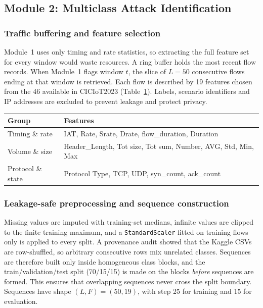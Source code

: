 \documentclass[]{interact}
\theoremstyle{plain}
\theoremstyle{definition}
\begin{document}
\subsection{Module 2: Multiclass Attack Identification}

\subsubsection{Traffic buffering and feature selection}
Module~1 uses only timing and rate statistics, so extracting the full feature set for every window would waste resources. A ring buffer holds the most recent flow records. When Module~1 flags window $t$, the slice of $L=50$ consecutive flows ending at that window is retrieved. Each flow is described by 19 features chosen from the 46 available in CICIoT2023 (Table~\ref{tab:feat}). Labels, scenario identifiers and IP addresses are excluded to prevent leakage and protect privacy.

\begin{table}[t]
{\begin{tabular}{lp{}}
\toprule
Group & Features \\
\midrule
Timing \& rate     & IAT, Rate, Srate, Drate, flow\_duration, Duration \\
Volume \& size     & Header\_Length, Tot size, Tot sum, Number, AVG, Std, Min, Max \\
Protocol \& state  & Protocol Type, TCP, UDP, syn\_count, ack\_count \\
\bottomrule
\end{tabular}}
\label{tab:feat}
\end{table}

\subsubsection{Leakage-safe preprocessing and sequence construction}
Missing values are imputed with training-set medians, infinite values are clipped to the finite training maximum, and a \texttt{StandardScaler} fitted on training flows only is applied to every split. A provenance audit showed that the Kaggle CSVs are row-shuffled, so arbitrary consecutive rows mix unrelated classes. Sequences are therefore built only inside homogeneous class blocks, and the train/validation/test split (70/15/15) is made on the blocks \emph{before} sequences are formed. This ensures that overlapping sequences never cross the split boundary. Sequences have shape $(L,F)=(50,19)$, with step 25 for training and 15 for evaluation.
\end{document}
